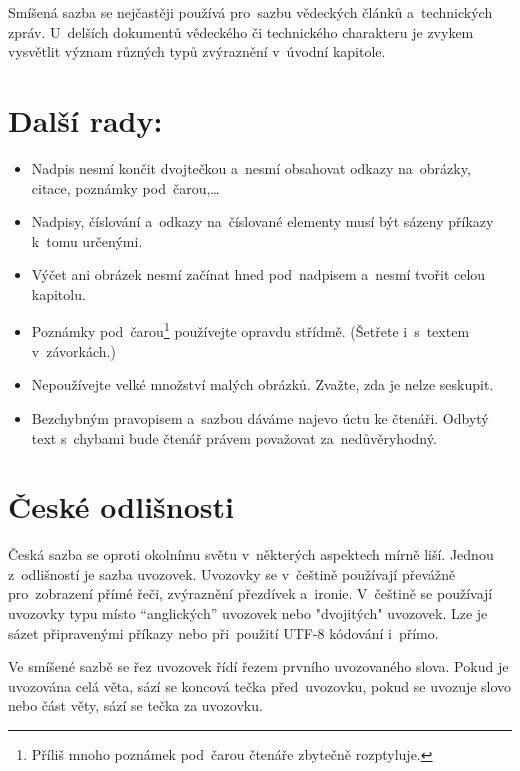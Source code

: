 \documentclass[czech,a4paper,10pt,twocolumn]{article}
\begin{document}
Smíšená sazba se nejčastěji používá pro~sazbu vědeckých článků a~technických zpráv. U~delších dokumentů vědeckého či technického charakteru je zvykem vysvětlit význam různých typů zvýraznění v~úvodní kapitole.

\section{Další rady:}

\begin{itemize}
    
\item Nadpis nesmí končit dvojtečkou a~nesmí obsahovat odkazy na~obrázky, citace, poznámky pod~čarou,\dots

\item Nadpisy, číslování a~odkazy na~číslované elementy musí být sázeny příkazy k~tomu určenými.

\item Výčet ani obrázek nesmí začínat hned pod~nadpisem a~nesmí tvořit celou kapitolu.

\item Poznámky pod~čarou\footnote{Příliš mnoho poznámek pod~čarou čtenáře zbytečně rozptyluje.} používejte opravdu střídmě. (Šetřete i~s~textem v~závorkách.)

\item Nepoužívejte velké množství malých obrázků. Zvažte, zda je nelze seskupit.

\item Bezchybným pravopisem a~sazbou dáváme najevo úctu ke čtenáři. Odbytý text s~chybami bude čtenář právem považovat za~nedůvěryhodný.

\end{itemize}

\section{České odlišnosti}

Česká sazba se oproti okolnímu světu v~některých aspektech mírně liší. Jednou z~odlišností je sazba uvozovek. Uvozovky se v~češtině používají převážně pro~zobrazení přímé řeči, zvýraznění přezdívek a~ironie. V~češtině se používají uvozovky typu  místo ``anglických'' uvozovek nebo "dvojitých" uvozovek. Lze je sázet připravenými příkazy nebo při~použití UTF-8 kódování i~přímo.

Ve smíšené sazbě se řez uvozovek řídí řezem prvního uvozovaného slova. Pokud je uvozována celá věta, sází se koncová tečka před~uvozovku, pokud se uvozuje slovo nebo část věty, sází se tečka za uvozovku.
\end{document}
